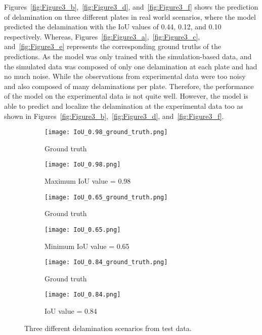 Figures~\ref{fig:Figure3_b},~\ref{fig:Figure3_d}, and~\ref{fig:Figure3_f} shows the prediction of delamination on three different plates in real world scenarios, where the model predicted the delamination with the IoU values of 0.44, 0.12, and 0.10 respectively.
Whereas, Figures~\ref{fig:Figure3_a},~\ref{fig:Figure3_c}, and~\ref{fig:Figure3_e} represents the corresponding ground truths of the predictions.
As the model was only trained with the simulation-based data, and the simulated data was composed of only one delamination at each plate and had no much noise.
While the observations from experimental data were too noisy and also composed of many delaminations per plate.
Therefore, the performance of the model on the experimental data is not quite well.
However, the model is able to predict and localize the delamination at the experimental data too as shown in Figures~\ref{fig:Figure3_b},~\ref{fig:Figure3_d}, and~\ref{fig:Figure3_f}. 
\begin{figure} [!h]
	\centering
	\begin{subfigure}[b]{0.49\textwidth}
		\centering
		\texttt{[image: IoU\_0.98\_ground\_truth.png]}
		\caption{Ground truth}
		\label{fig:Figure2_a}
	\end{subfigure}
	\hfill
	\begin{subfigure}[b]{0.49\textwidth}
		\centering
		\texttt{[image: IoU\_0.98.png]}
		\caption{Maximum IoU value = 0.98}
		\label{fig:Figure2_b}
	\end{subfigure}
	\hfill
	\begin{subfigure}[b]{0.49\textwidth}
		\centering
		\texttt{[image: IoU\_0.65\_ground\_truth.png]}
		\caption{Ground truth}
		\label{fig:Figure2_c}
	\end{subfigure}
	\hfill
	\begin{subfigure}[b]{0.49\textwidth}
		\centering
		\texttt{[image: IoU\_0.65.png]}
		\caption{Minimum IoU value = 0.65}
		\label{fig:Figure2_d}
	\end{subfigure}
	\hfill
	\begin{subfigure}[b]{0.49\textwidth}
		\centering
		\texttt{[image: IoU\_0.84\_ground\_truth.png]}
		\caption{Ground truth}
		\label{fig:Figure2_e}
	\end{subfigure}
	\hfill	
	\begin{subfigure}[b]{0.49\textwidth}
		\centering
		\texttt{[image: IoU\_0.84.png]}
		\caption{IoU value = 0.84}
		\label{fig:Figure2_f}
	\end{subfigure}
	\caption{Three different delamination scenarios from test data.}
	\label{fig:Figure2}
\end{figure} 
